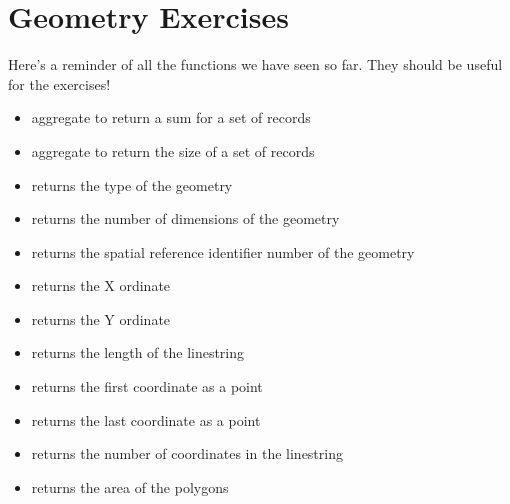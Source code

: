 \documentclass[a4paper,11pt,english]{sphinxmanual}
\begin{document}
\section{Geometry Exercises}
\label{\detokenize{basic:geometry-exercises}}\label{\detokenize{basic:geometries-exercises}}
Here’s a reminder of all the functions we have seen so far. They should be useful for the exercises!
\begin{itemize}
\item {} 
 aggregate to return a sum for a set of records

\item {} 
 aggregate to return the size of a set of records

\item {} 
 returns the type of the geometry

\item {} 
 returns the number of dimensions of the geometry

\item {} 
 returns the spatial reference identifier number of the geometry

\item {} 
 returns the X ordinate

\item {} 
 returns the Y ordinate

\item {} 
 returns the length of the linestring

\item {} 
 returns the first coordinate as a point

\item {} 
 returns the last coordinate as a point

\item {} 
 returns the number of coordinates in the linestring

\item {} 
 returns the area of the polygons


\end{itemize}
\end{document}
